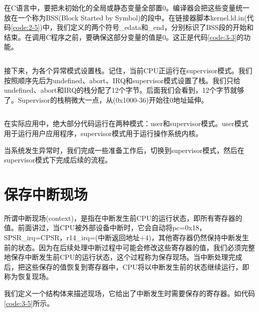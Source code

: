 \documentclass[main.tex]{subfiles}
\begin{document}
\begin{CJK*}{UTF8}{song}
\begin{code}
\label{code:3-2}
\inputminted[firstline=104,lastline=112,linenos,numbersep=5pt,frame=lines,framesep=2mm]{gas}{src/chapter03/kernel/entry.S}
\end{code}

在C语言中，要把未初始化的全局或静态变量全部置0。编译器会把这些变量统一放在一个称为BSS(Block Started by Symbol)的段中。在链接器脚本kernel.ld.in(代码\ref{code:2-5})中，我们定义的两个符号\_edata和\_end，分别标识了BSS段的开始和结束。在调用C程序之前，要确保这部分变量的值是0。这正是代码\ref{code:3-3}的功能。

\begin{code}
\label{code:3-3}
\inputminted[firstline=112,lastline=121,linenos,numbersep=5pt,frame=lines,framesep=2mm]{gas}{src/chapter03/kernel/entry.S}
\end{code}

接下来，为各个异常模式设置栈。记住，当前CPU正运行在supervisor模式。我们按照顺序先后为undefined、abort、IRQ和supervisor模式设置了栈。我们只给undefined、abort和IRQ的栈分配了12个字节。后面我们会看到，12个字节就够了。Supervisor的栈稍微大一点，从(0x1000-36)开始往0地址延伸。
\begin{code}
\label{code:3-4}
\inputminted[firstline=121,lastline=143,linenos,numbersep=5pt,frame=lines,framesep=2mm]{gas}{src/chapter03/kernel/entry.S}
\end{code}

在实际应用中，绝大部分代码运行在两种模式：user和supervisor模式。user模式用于运行用户应用程序，supervisor模式用于运行操作系统内核。
\par
当系统发生异常时，我们完成一些准备工作后，切换到supervisor模式，然后在supervisor模式下完成后续的流程。

\section{保存中断现场}
所谓中断现场(context)，是指在中断发生前CPU的运行状态，即所有寄存器的值。前面讲过，当CPU被外部设备中断时，它会自动将pc=0x18，SPSR\_irq=CPSR，r14\_irq=(中断返回地址+4)，其他寄存器仍然保持中断发生前的状态。因为在后续处理中断过程中可能会修改这些寄存器的值，我们必须完整地保存中断发生前CPU的运行状态，这个过程称为保存现场。当中断处理完成后，把这些保存的值恢复到寄存器中，CPU将以中断发生前的状态继续运行，即称为恢复现场。

\par
我们定义一个结构体来描述现场，它给出了中断发生时需要保存的寄存器。如代码\ref{code:3-5}所示。


\end{CJK*}
\end{document}
